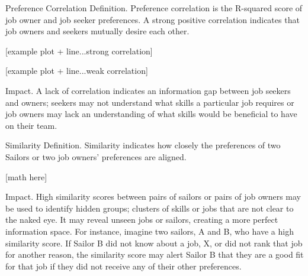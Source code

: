 Preference Correlation
Definition.
Preference correlation is the R-squared score of job owner and job seeker preferences.  A strong positive correlation indicates that job owners and seekers mutually desire each other. 

[example plot + line...strong correlation]

[example plot + line...weak correlation]

Impact. 
A lack of correlation indicates an information gap between job seekers and owners; seekers may not understand what skills a particular job requires or job owners may lack an understanding of what skills would be beneficial to have on their team. 

Similarity
Definition.
Similarity indicates how closely the preferences of two Sailors or two job owners’ preferences are aligned.

[math here]


Impact. 
High similarity scores between pairs of sailors or pairs of job owners may be used to identify hidden groups; clusters of skills or jobs that are not clear to the naked eye. It may reveal unseen jobs or sailors, creating a more perfect information space. For instance, imagine two sailors, A and B, who have a high similarity score. If Sailor B did not know about a job, X, or did not rank that job for another reason, the similarity score may alert Sailor B that they are a good fit for that job if they did not receive any of their other preferences.
